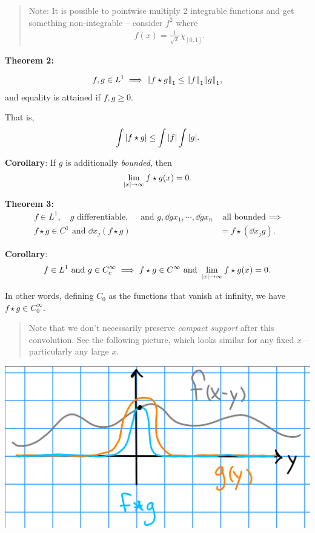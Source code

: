 \begin{quote}
Note: It is possible to pointwise multiply 2 integrable functions and
get something non-integrable -- consider \(f^2\) where
\begin{align*}
f(x) = \frac{1}{\sqrt x} \chi_{[0,1]}
.\end{align*}
\end{quote}

\textbf{Theorem 2:}

\begin{align*} f,g \in L^1 \implies {\left\lVert {f\star g} \right\rVert}_1 \leq {\left\lVert {f} \right\rVert}_1 {\left\lVert {g} \right\rVert}_1,\end{align*}
and equality is attained if \(f, g \geq 0\).

That is,
\begin{align*}
\int {\left\lvert {f\star g} \right\rvert} \leq \int{\left\lvert {f} \right\rvert} \int{\left\lvert {g} \right\rvert}
.\end{align*}

\textbf{Corollary}: If \(g\) is additionally \emph{bounded}, then
\begin{align*}
\lim_{{\left\lvert {x} \right\rvert} \to \infty} f\star g(x) = 0
.\end{align*}

\textbf{Theorem 3:} \begin{align*}
f\in L^1, \quad g \text{ differentiable}, \quad \text{ and } g, \dd{g}{x_1}, \cdots, \dd{g}{x_n} &\text{ all bounded } \implies \\
f\star g \in C^1  
\text{ and }\dd{}{x_j} (f\star g) &= f\star (\dd{}{x_j} g)
.\end{align*}

\textbf{Corollary}:
\begin{align*}
f\in L^1  \text{ and } g\in C^\infty_c \implies f\star g \in C^\infty \text{ and } \lim_{{\left\lvert {x} \right\rvert} \to \infty} f\star g(x) = 0
.\end{align*}

In other words, defining \(C_0\) as the functions that vanish at
infinity, we have \(f\star g \in C_0^\infty\).

\begin{quote}
Note that we don't necessarily preserve \emph{compact support} after
this convolution. See the following picture, which looks similar for any
fixed \(x\) -- particularly any large \(x\).
\end{quote}

\includegraphics{figures/2019-10-22-11:55.png}\\

